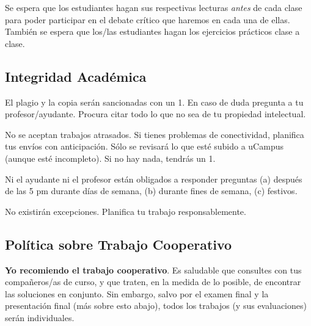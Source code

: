 \documentclass[letterpaper]{article}
\renewenvironment{itemize}{
  \begin{list}{}{
    \setlength{\leftmargin}{1.5em}
  }
}{
  \end{list}
}
\begin{document}
\begin{itemize}
    \item[{\color{red}\Pointinghand}] Se espera que los estudiantes hagan sus respectivas lecturas \emph{antes} de cada clase para poder participar en el debate cr\'itico que haremos en cada una de ellas. Tambi\'en se espera que los/las estudiantes hagan los ejercicios pr\'acticos clase a clase.
\end{itemize}





\subsection*{Integridad Acad\'emica}


\begin{itemize}
	\item[$\circ$] El plagio y la copia ser\'an sancionadas con un 1. En caso de duda pregunta a tu profesor/ayudante. Procura citar todo lo que no sea de tu propiedad intelectual.
	\item[$\circ$] No se aceptan trabajos atrasados. Si tienes problemas de conectividad, planifica tus env\'ios con anticipaci\'on. S\'olo se revisar\'a lo que est\'e subido a uCampus (aunque est\'e incompleto). Si no hay nada, tendr\'as un 1.
	\item[$\circ$] Ni el ayudante ni el profesor est\'an obligados a responder preguntas (a) despu\'es de las 5 pm durante d\'ias de semana, (b) durante fines de semana, (c) festivos.
\end{itemize}

\begin{itemize}
\item[{\color{red}\Pointinghand}] No existir\'an excepciones. Planifica tu trabajo responsablemente. 
\end{itemize}

\subsection*{Pol\'itica sobre Trabajo Cooperativo}

{\bf Yo recomiendo el trabajo cooperativo}. Es saludable que consultes con tus compa\~neros/as de curso, y que traten, en la medida de lo posible, de encontrar las soluciones en conjunto. Sin embargo, salvo por el examen final y la presentaci\'on final (m\'as sobre esto abajo), todos los trabajos (y sus evaluaciones) ser\'an individuales.
\end{document}
